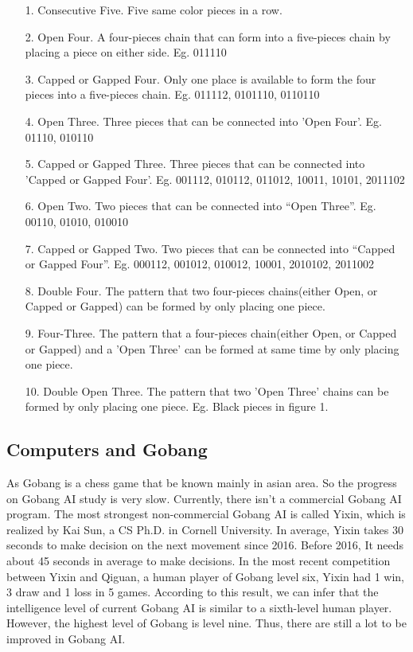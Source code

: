 \documentclass[11pt, a4paper]{article}
\begin{document}
\begin{itemize}
\item[1.] Consecutive Five. Five same color pieces in a row.
\item[2.] Open Four. A four-pieces chain that can form into a five-pieces chain by placing a piece on either side. Eg. 011110
\item[3.] Capped or Gapped Four. Only one place is available to form the four pieces into a five-pieces chain. Eg. 011112, 0101110, 0110110
\item[4.] Open Three. Three pieces that can be connected into 'Open Four'. Eg. 01110, 010110
\item[5.] Capped or Gapped Three. Three pieces that can be connected into 'Capped or Gapped Four'. Eg. 001112, 010112, 011012, 10011, 10101, 2011102
\item[6.] Open Two. Two pieces that can be connected into “Open Three”. Eg. 00110, 01010, 010010
\item[7.] Capped or Gapped Two. Two pieces that can be connected into “Capped or Gapped Four”. Eg. 000112, 001012, 010012, 10001, 2010102, 2011002
\item[8.] Double Four. The pattern that two four-pieces chains(either Open, or Capped or Gapped) can be formed by only placing one piece.
\item[9.] Four-Three. The pattern that a four-pieces chain(either Open, or Capped or Gapped) and a 'Open Three' can be formed at same time by only placing one piece.
\item[10.] Double Open Three. The pattern that two 'Open Three' chains can be formed by only placing one piece. Eg. Black pieces in figure 1.

\end{itemize}

\subsection{Computers and Gobang}

As Gobang is a chess game that be known mainly in asian area. So the progress on Gobang AI study is very slow. Currently, there isn’t a commercial Gobang AI program. The most strongest non-commercial Gobang AI is called Yixin, which is realized by Kai Sun, a CS Ph.D. in Cornell University. In average, Yixin takes 30 seconds to make decision on the next movement since 2016. Before 2016, It needs about 45 seconds in average to make decisions. In the most recent competition between Yixin and Qiguan, a human player of Gobang level six, Yixin had 1 win, 3 draw and 1 loss in 5 games. According to this result, we can infer that the intelligence level of current Gobang AI is similar to a sixth-level human player. However, the highest level of Gobang is level nine. Thus, there are still a lot to be improved in Gobang AI.
\end{document}
